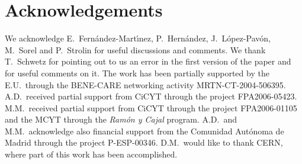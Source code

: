 \documentclass[12pt]{elsart}
\begin{document}
\section*{Acknowledgements}

We acknowledge E.~Fern\'andez-Mart\'{\i}nez, P.~Hern\'andez,
J.~L\'opez-Pav\'on, M.~Sorel and P.~Strolin for useful discussions and
comments.  We thank T.~Schwetz for pointing out to us an error in the
first version of the paper and for useful comments on it. The work has
been partially supported by the E.U.\ through the BENE-CARE networking
activity MRTN-CT-2004-506395. A.D.\ received partial support from
CiCYT through the project FPA2006-05423.  M.M.\ received partial
support from CiCYT through the project FPA2006-01105 and the MCYT
through the \emph{Ram\'on y Cajal} program.  A.D.\ and M.M.\
acknowledge also financial support from the Comunidad Aut\'onoma de
Madrid through the project P-ESP-00346. D.M.\ would like to thank
CERN, where part of this work has been accomplished.
\end{document}
